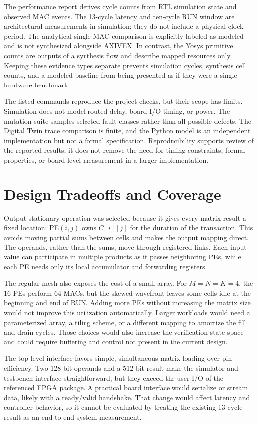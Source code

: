 \documentclass[conference]{IEEEtran}
\begin{document}
The performance report derives cycle counts from RTL simulation state and observed MAC events. The 13-cycle latency
and ten-cycle RUN window are architectural measurements in simulation; they do not include a physical clock period.
The analytical single-MAC comparison is explicitly labeled as modeled and is not synthesized alongside AXIVEX. In
contrast, the Yosys primitive counts are outputs of a synthesis flow and describe mapped resources only. Keeping
these evidence types separate prevents simulation cycles, synthesis cell counts, and a modeled baseline from being
presented as if they were a single hardware benchmark.

The listed commands reproduce the project checks, but their scope has limits. Simulation does not model routed delay,
board I/O timing, or power. The mutation suite samples selected fault classes rather than all possible defects. The
Digital Twin trace comparison is finite, and the Python model is an independent implementation but not a formal
specification. Reproducibility supports review of the reported results; it does not remove the need for timing
constraints, formal properties, or board-level measurement in a larger implementation.

\section{Design Tradeoffs and Coverage}
Output-stationary operation was selected because it gives every matrix result a fixed location: PE$(i,j)$ owns
$C[i][j]$ for the duration of the transaction. This avoids moving partial sums between cells and makes the output
mapping direct. The operands, rather than the sums, move through registered links. Each input value can participate
in multiple products as it passes neighboring PEs, while each PE needs only its local accumulator and forwarding
registers.

The regular mesh also exposes the cost of a small array. For $M=N=K=4$, the 16 PEs perform 64 MACs, but the skewed
wavefront leaves some cells idle at the beginning and end of RUN. Adding more PEs without increasing the matrix size
would not improve this utilization automatically. Larger workloads would need a parameterized array, a tiling scheme,
or a different mapping to amortize the fill and drain cycles. Those choices would also increase the verification state
space and could require buffering and control not present in the current design.

The top-level interface favors simple, simultaneous matrix loading over pin efficiency. Two 128-bit operands and a
512-bit result make the simulator and testbench interface straightforward, but they exceed the user I/O of the
referenced FPGA package. A practical board interface would serialize or stream data, likely with a ready/valid
handshake. That change would affect latency and controller behavior, so it cannot be evaluated by treating the
existing 13-cycle result as an end-to-end system measurement.
\end{document}
